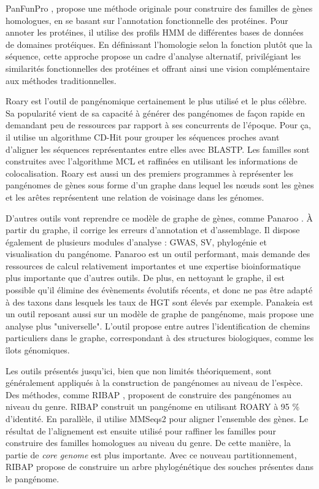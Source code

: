 PanFunPro \cite{lukjancenko_panfunpro_2013}, propose une méthode originale pour construire des familles de gènes homologues, en se basant sur l'annotation fonctionnelle des protéines. Pour annoter les protéines, il utilise des profils HMM de différentes bases de données de domaines protéiques. En définissant l’homologie selon la fonction plutôt que la séquence, cette approche propose un cadre d’analyse alternatif, privilégiant les similarités fonctionnelles des protéines et offrant ainsi une vision complémentaire aux méthodes traditionnelles.

Roary \cite{page_roary_2015} est l'outil de pangénomique certainement le plus utilisé et le plus célèbre. Sa popularité vient de sa capacité à générer des pangénomes de façon rapide en demandant peu de ressources par rapport à ses concurrents de l'époque. Pour ça, il utilise un algorithme CD-Hit pour grouper les séquences proches avant d'aligner les séquences représentantes entre elles avec BLASTP. Les familles sont construites avec l'algorithme MCL et raffinées en utilisant les informations de colocalisation. Roary est aussi un des premiers programmes à représenter les pangénomes de gènes sous forme d'un graphe dans lequel les n\oe uds sont les gènes et les arêtes représentent une relation de voisinage dans les génomes.

\newpage
D'autres outils vont reprendre ce modèle de graphe de gènes, comme Panaroo \cite{tonkin-hill_producing_2020}. À partir du graphe, il corrige les erreurs d'annotation et d'assemblage. Il dispose également de plusieurs modules d'analyse : GWAS, SV, phylogénie et visualisation du pangénome. Panaroo est un outil performant, mais demande des ressources de calcul relativement importantes et une expertise bioinformatique plus importante que d'autres outils. De plus, en nettoyant le graphe, il est possible qu'il élimine des évènements évolutifs récents, et donc ne pas être adapté à des taxons dans lesquels les taux de HGT sont élevés par exemple. Panakeia \cite{beier_panakeia_2022} est un outil reposant aussi sur un modèle de graphe de pangénome, mais propose une analyse plus "universelle". L'outil propose entre autres l'identification de chemins particuliers dans le graphe, correspondant à des structures biologiques, comme les îlots génomiques.

Les outils présentés jusqu'ici, bien que non limités théoriquement, sont généralement appliqués à la construction de pangénomes au niveau de l'espèce. Des méthodes, comme RIBAP \cite{lamkiewicz_ribap_2024}, proposent de construire des pangénomes au niveau du genre. RIBAP construit un pangénome en utilisant ROARY à 95 \% d'identité. En parallèle, il utilise MMSeqs2 pour aligner l'ensemble des gènes. Le résultat de l'alignement est ensuite utilisé pour raffiner les familles pour construire des familles homologues au niveau du genre. De cette manière, la partie de \textit{core genome} est plus importante. Avec ce nouveau partitionnement, RIBAP propose de construire un arbre phylogénétique des souches présentes dans le pangénome. 

